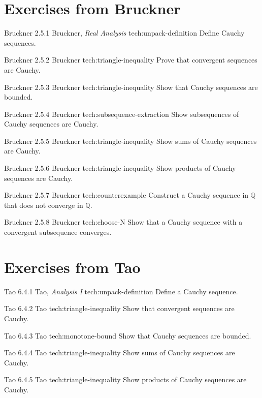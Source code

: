 \section*{Exercises from Bruckner}

\cauchyex
{Bruckner 2.5.1}
{Bruckner, \textit{Real Analysis}}
{tech:unpack-definition}
{Define Cauchy sequences.}

\cauchyex
{Bruckner 2.5.2}
{Bruckner}
{tech:triangle-inequality}
{Prove that convergent sequences are Cauchy.}

\cauchyex
{Bruckner 2.5.3}
{Bruckner}
{tech:triangle-inequality}
{Show that Cauchy sequences are bounded.}

\cauchyex
{Bruckner 2.5.4}
{Bruckner}
{tech:subsequence-extraction}
{Show subsequences of Cauchy sequences are Cauchy.}

\cauchyex
{Bruckner 2.5.5}
{Bruckner}
{tech:triangle-inequality}
{Show sums of Cauchy sequences are Cauchy.}

\cauchyex
{Bruckner 2.5.6}
{Bruckner}
{tech:triangle-inequality}
{Show products of Cauchy sequences are Cauchy.}

\cauchyex
{Bruckner 2.5.7}
{Bruckner}
{tech:counterexample}
{Construct a Cauchy sequence in $\mathbb{Q}$ that does not converge in $\mathbb{Q}$.}

\cauchyex
{Bruckner 2.5.8}
{Bruckner}
{tech:choose-N}
{Show that a Cauchy sequence with a convergent subsequence converges.}


\section*{Exercises from Tao}

\cauchyex
{Tao 6.4.1}
{Tao, \textit{Analysis I}}
{tech:unpack-definition}
{Define a Cauchy sequence.}

\cauchyex
{Tao 6.4.2}
{Tao}
{tech:triangle-inequality}
{Show that convergent sequences are Cauchy.}

\cauchyex
{Tao 6.4.3}
{Tao}
{tech:monotone-bound}
{Show that Cauchy sequences are bounded.}

\cauchyex
{Tao 6.4.4}
{Tao}
{tech:triangle-inequality}
{Show sums of Cauchy sequences are Cauchy.}

\cauchyex
{Tao 6.4.5}
{Tao}
{tech:triangle-inequality}
{Show products of Cauchy sequences are Cauchy.}

